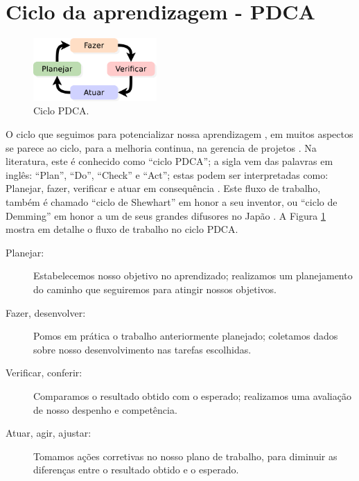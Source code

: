 \section{Ciclo da aprendizagem - PDCA}
\label{sec:cicloaprendizagem}

\begin{figure}
  \centering
    \includegraphics[width=0.42\textwidth]{chapters/cap-learning/ciclo2.eps}
\caption{Ciclo PDCA.}
\label{fig:ciclopdca}
\end{figure}
O ciclo que seguimos para potencializar nossa aprendizagem \cite[pp. 13]{mumford2001aprendendo},
em muitos aspectos se parece ao ciclo, para a melhoria continua, na gerencia de projetos 
\cite[pp. 4]{caloba2018gerenciamento} \cite[pp. 59]{teixeira2018gestao}.
Na literatura, este é conhecido como ``ciclo PDCA'';
a sigla vem das palavras em inglês: ``Plan'', ``Do'', ``Check'' e ``Act'';
estas podem ser interpretadas como: Planejar, fazer, verificar e atuar em consequência
\cite[pp. 59]{teixeira2018gestao} \cite[pp. 4]{caloba2018gerenciamento}.
Este fluxo de trabalho, também é chamado ``ciclo de Shewhart'' em honor a seu inventor,
ou ``ciclo de Demming'' em honor a um de seus grandes difusores no Japão
\cite[pp. 59]{teixeira2018gestao} \cite[pp. 4]{caloba2018gerenciamento}.
A Figura \ref{fig:ciclopdca} mostra em detalhe o fluxo de trabalho no ciclo PDCA.


\begin{description}
\item[Planejar:] Estabelecemos nosso objetivo no aprendizado; 
realizamos um planejamento do caminho que seguiremos para atingir nossos objetivos.
\item[Fazer, desenvolver:] Pomos em prática o trabalho anteriormente planejado;
coletamos dados sobre nosso desenvolvimento nas tarefas escolhidas.
\item[Verificar, conferir:] Comparamos o resultado obtido com o esperado;
realizamos uma avaliação de nosso despenho e competência.
\item[Atuar, agir, ajustar:] Tomamos ações corretivas no nosso plano de trabalho,
para diminuir as diferenças entre o resultado obtido e o esperado.
\end{description}
